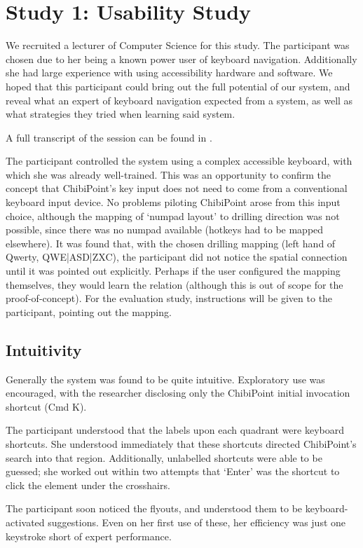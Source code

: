 \documentclass[11pt,openright,a4paper]{report}
\begin{document}
\section{Study 1: Usability Study}
We recruited a lecturer of Computer Science for this study. The participant was chosen due to her being a known power user of keyboard navigation. Additionally she had large experience with using accessibility hardware and software. We hoped that this participant could bring out the full potential of our system, and reveal what an expert of keyboard navigation expected from a system, as well as what strategies they tried when learning said system.

A full transcript of the session can be found in .

The participant controlled the system using a complex accessible keyboard, with which she was already well-trained. This was an opportunity to confirm the concept that ChibiPoint's key input does not need to come from a conventional keyboard input device. No problems piloting ChibiPoint arose from this input choice, although the mapping of `numpad layout' to drilling direction was not possible, since there was no numpad available (hotkeys had to be mapped elsewhere). It was found that, with the chosen drilling mapping (left hand of Qwerty, QWE|ASD|ZXC), the participant did not notice the spatial connection until it was pointed out explicitly. Perhaps if the user configured the mapping themselves, they would learn the relation (although this is out of scope for the proof-of-concept). For the evaluation study, instructions will be given to the participant, pointing out the mapping.

\subsection{Intuitivity}
Generally the system was found to be quite intuitive. Exploratory use was encouraged, with the researcher disclosing only the ChibiPoint initial invocation shortcut (Cmd K).

The participant understood that the labels upon each quadrant were keyboard shortcuts. She understood immediately that these shortcuts directed ChibiPoint's search into that region. Additionally, unlabelled shortcuts were able to be guessed; she worked out within two attempts that `Enter' was the shortcut to click the element under the crosshairs.

The participant soon noticed the flyouts, and understood them to be keyboard-activated suggestions. Even on her first use of these, her efficiency was just one keystroke short of expert performance.
\end{document}
